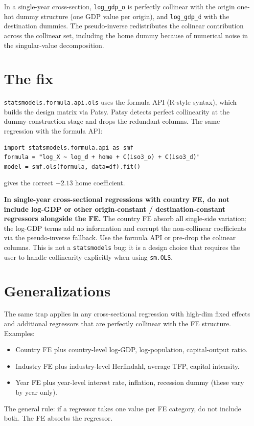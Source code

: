 \documentclass[11pt,letterpaper,oneside]{book}
\theoremstyle{definition}
\theoremstyle{remark}
\begin{document}
In a single-year cross-section, \texttt{log\_gdp\_o} is perfectly
collinear with the origin one-hot dummy structure (one GDP value per
origin), and \texttt{log\_gdp\_d} with the destination dummies. The
pseudo-inverse redistributes the colinear contribution across the
collinear set, including the home dummy because of numerical noise in
the singular-value decomposition.

\section{The fix}

\texttt{statsmodels.formula.api.ols} uses the formula API (R-style
syntax), which builds the design matrix via Patsy. Patsy detects
perfect collinearity at the dummy-construction stage and drops the
redundant columns. The same regression with the formula API:
\begin{lstlisting}
import statsmodels.formula.api as smf
formula = "log_X ~ log_d + home + C(iso3_o) + C(iso3_d)"
model = smf.ols(formula, data=df).fit()
\end{lstlisting}
gives the correct $+2.13$ home coefficient.

\begin{insight}
\textbf{In single-year cross-sectional regressions with country FE,
do not include log-GDP or other origin-constant / destination-constant
regressors alongside the FE.} The country FE absorb all single-side
variation; the log-GDP terms add no information and corrupt the
non-collinear coefficients via the pseudo-inverse fallback. Use the
formula API or pre-drop the colinear columns. This is not a
\texttt{statsmodels} bug; it is a design choice that requires the user
to handle collinearity explicitly when using \texttt{sm.OLS}.
\end{insight}

\section{Generalizations}

The same trap applies in any cross-sectional regression with high-dim
fixed effects and additional regressors that are perfectly collinear
with the FE structure. Examples:
\begin{itemize}
  \item Country FE plus country-level log-GDP, log-population, capital-output ratio.
  \item Industry FE plus industry-level Herfindahl, average TFP, capital intensity.
  \item Year FE plus year-level interest rate, inflation, recession dummy
    (these vary by year only).
\end{itemize}
The general rule: if a regressor takes one value per FE category, do
not include both. The FE absorbs the regressor.
\end{document}
